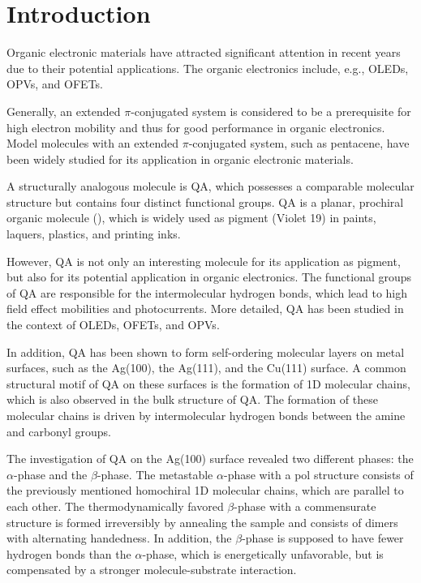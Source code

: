 \chapter{Introduction}

Organic electronic materials have attracted significant attention in recent years due to their potential applications. The organic electronics include, e.g., \acp{OLED}, \acp{OPV}, and \acp{OFET}.\autocite{Mitschke2000,Farinola2011,Dou2015,Wu2010,Lu2015,Koch2007}

Generally, an extended $\pi$-conjugated system is considered to be a prerequisite for high electron mobility and thus for good performance in organic electronics.\autocite{Jiang2022,Zhang2018} Model molecules with an extended $\pi$-conjugated system, such as pentacene, have been widely studied for its application in organic electronic materials.\autocite{Kitamura2008,Yang2016,Kitamura2003}

A structurally analogous molecule is \acf{QA}, which possesses a comparable molecular structure but contains four distinct functional groups. \Ac{QA} is a planar, prochiral organic molecule (), which is widely used as pigment (Violet 19) in paints, laquers, plastics, and printing inks.\autocite{Struve1958,Zollinger2003, Faulkner2009,Hye2012}

However, \ac{QA} is not only an interesting molecule for its application as pigment, but also for its potential application in organic electronics. The functional groups of \ac{QA} are responsible for the intermolecular hydrogen bonds, which lead to high field effect mobilities and photocurrents.\autocite{Glowacki2011,Glowacki2012,Glowacki2013} More detailed, \ac{QA} has been studied in the context of \acp{OLED}\autocite{Wang2016a,Min2021,Cunha2018}, \acp{OFET}\autocite{Jeong2018,Jeong2017}, and \acp{OPV}\autocite{Dunst2017,Sung2017,Kanbur2019,Berg2009}.
 
In addition, \ac{QA} has been shown to form self-ordering molecular layers on metal surfaces, such as the Ag(100), the Ag(111), and the Cu(111) surface.\autocite{Humberg2020,Humberg2024,Humberg2025,Wagner2014} A common structural motif of \ac{QA} on these surfaces is the formation of 1D molecular chains, which is also observed in the bulk structure of \ac{QA}.\autocite{Paulus2007} The formation of these molecular chains is driven by intermolecular hydrogen bonds between the amine and carbonyl groups.\autocite{Humberg2020,Humberg2024,Humberg2025}

The investigation of \ac{QA} on the Ag(100) surface revealed two different phases: the $\alpha$-phase and the $\beta$-phase. The metastable $\alpha$-phase with a \ac{pol} structure consists of the previously mentioned homochiral 1D molecular chains, which are parallel to each other. The thermodynamically favored $\beta$-phase with a commensurate structure is formed irreversibly by annealing the sample and consists of dimers with alternating handedness. In addition, the $\beta$-phase is supposed to have fewer hydrogen bonds than the $\alpha$-phase, which is energetically unfavorable, but is compensated by a stronger molecule-substrate interaction.\autocite{Humberg2020,Humberg2025}

